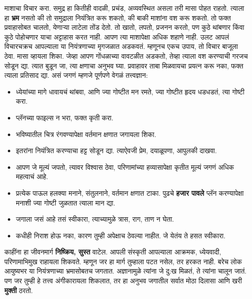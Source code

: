 माशाचा विचार करा. समुद्र हा कितीही वादळी, प्रचंड, अव्यवस्थित असला तरी मासा पोहत राहतो. त्याला हा \textbf{भ्रम} नसतो की तो समुद्राला नियंत्रित करू शकतो, की बाकी माशांना वश करू शकतो. तो फक्त प्रवाहासोबत चालतो, येणाऱ्या लाटेला तोंड देतो. तो खातो, लपतो, प्रजनन करतो, पण कुठे थांबणार किंवा कुठे पोहोचणार याचा अट्टाहास करत नाही.
आपण त्या माशापेक्षा अधिक शहाणे नाही. उलट आपलं विचारचक्रच आपल्याला या नियंत्रणाच्या मृगजळात अडकवतं. म्हणूनच एकच उपाय, तो विचार बाजूला ठेवा. मासा व्हायला शिका.
जेव्हा आपण गोंधळाच्या वावटळीत अडकतो, तेव्हा त्याला वश करण्याची गरजच सोडून द्या. त्यात बुडून जा, त्या क्षणाचा अनुभव घ्या. प्रवाहावर ताबा मिळवायचा प्रयत्न करू नका, फक्त त्याला प्रतिसाद द्या.
असं जगणं म्हणजे पूर्णपणे वेगळं तत्त्वज्ञान:
 \begin{itemize}
 \item ध्येयांच्या मागे धावायचं थांबवा, आणि ज्या गोष्टीत मन रमते, ज्या गोष्टीत हृदय धडधडतं, त्या गोष्टी करा.
 \item प्लॅनच्या फाइल्स न भरा, फक्त कृती करा.
 \item भविष्यातील चित्र रंगवण्यापेक्षा वर्तमान क्षणात जगायला शिका.
 \item इतरांना नियंत्रित करण्याचा हट्ट सोडून द्या. त्याऐवजी प्रेम, दयाळूपणा, आपुलकी दाखवा.
 \item आपण जे मूल्यं जपतो, त्यावर विश्वास ठेवा, परिणामांच्या हव्यासापेक्षा कृतीत मूल्यं जगणं अधिक महत्वाचं आहे.
 \item प्रत्येक पाऊल हलक्या मनाने, संतुलनाने, वर्तमान क्षणात टाका. पुढचे \textbf{हजार पावले} प्लॅन करण्यापेक्षा मनाशी ज्या गोष्टी जुळतात त्याला मान द्या.
 \item जगाला जसं आहे तसं स्वीकारा, त्याच्यामुळे त्रास, राग, ताण न घेता.
 \item कधीही निराश होऊ नका, कारण तुम्ही अपेक्षाच ठेवल्या नाहीत. जे येतंय ते हसत स्वीकारा.
 \end{itemize}
काहींना हा जीवनमार्ग \textbf{निष्क्रिय, सुस्त} वाटेल. आपली संस्कृती आपल्याला आक्रमक, ध्येयवादी, परिणामाभिमुख राहायला शिकवते. म्हणून जर हा मार्ग तुम्हाला पटत नसेल, तर हरकत नाही. बरेच लोक आयुष्यभर या नियंत्रणाच्या भ्रमासोबतच जगतात. अज्ञानामुळे त्यांना जे दु:ख मिळतं, ते त्यांना चालून जातं.
पण जर तुम्ही हे तत्त्व अंगीकारायला शिकलात, तर हा अनुभव जगातील सर्वात मोठा दिलासा आणि खरी \textbf{मुक्ती} ठरतो.



